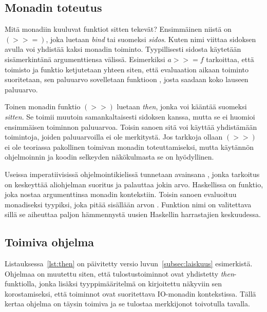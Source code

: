 \documentclass[finnish]{tktltiki2}
\begin{document}

\subsection{Monadin toteutus}

Mitä monadiin kuuluvat funktiot sitten tekevät? Ensimmäinen niistä on $(>>=)$, joka luetaan
\emph{bind} tai suomeksi \emph{sidos}. Kuten nimi viittaa sidoksen avulla voi yhdistää kaksi monadin
toiminto. Tyypillisesti sidosta käytetään sisämerkintänä argumenttiensa välissä. Esimerkiksi $a >>=
f$ tarkoittaa, että toimisto  ja funktio  ketjutetaan yhteen siten, että evaluaation
aikaan toiminto  suoritetaan, sen paluuarvo sovelletaan funktioon , josta saadaan
koko lauseen paluuarvo.

Toinen monadin funktio $(>>)$ luetaan \emph{then}, jonka voi kääntää suomeksi \emph{sitten}. Se
toimii muutoin samankaltaisesti sidoksen kanssa, mutta se ei huomioi ensimmäisen toiminnon
paluuarvoa. Toisin sanoen sitä voi käyttää yhdistämään toimintoja, joiden paluuarvoilla ei ole
merkitystä. Jos tarkkoja ollaan $(>>)$ ei ole teoriassa pakollinen toimivan monadin toteuttamiseksi,
mutta käytännön ohjelmoinnin ja koodin selkeyden näkökulmasta se on hyödyllinen.


Useissa imperatiivisissä ohjelmointikielissä tunnetaan avainsana , jonka tarkoitus on
keskeyttää aliohjelman suoritus ja palauttaa jokin arvo. Haskellissa  on funktio, joka
nostaa argumenttinsa monadin kontekstiin. Toisin sanoen  evaluoituu monadiseksi
tyypiksi, joka pitää sisällään arvon . Funktion  nimi on valitettava sillä se
aiheuttaa paljon hämmennystä uusien Haskellin harrastajien keskuudessa.

\subsection{Toimiva ohjelma}

Listauksessa~\ref{lst:then} on päivitetty versio luvun~\ref{subsec:laiskuus} esimerkistä. Ohjelmaa
on muutettu siten, että tulostustoiminnot ovat yhdistetty \emph{then}-funktiolla, jonka lisäksi
tyyppimääritelmä on kirjoitettu näkyviin sen korostamiseksi, että toiminnot ovat suoritettava
IO-monadin kontekstissa. Tällä kertaa ohjelma on täysin toimiva ja se tulostaa merkkijonot
toivotulla tavalla.
\end{document}
